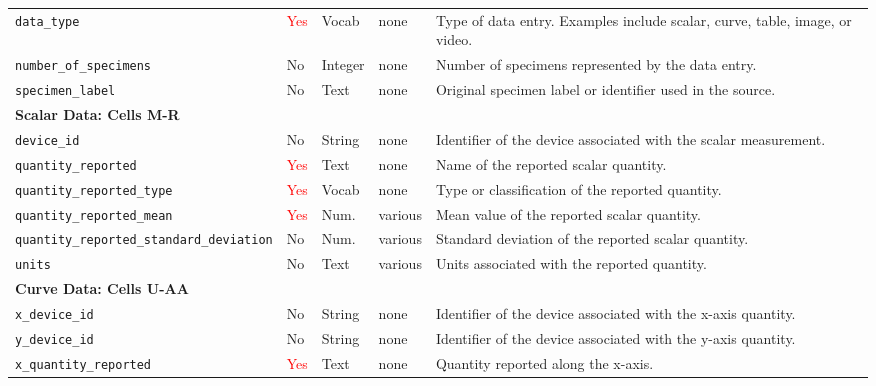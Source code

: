 \documentclass[11pt]{book}
\begin{document}
\begin{longtable}{p{}p{}p{}p{}p{}}
\texttt{data\_type} &
\textcolor{red}{Yes} &
Vocab &
none &
Type of data entry. Examples include scalar, curve, table, image, or video. \\

\texttt{number\_of\_specimens} &
No &
Integer &
none &
Number of specimens represented by the data entry. \\

\texttt{specimen\_label} &
No &
Text &
none &
Original specimen label or identifier used in the source. \\

\hline
\multicolumn{5}{l}{\textbf{Scalar Data: Cells M-R}} \\
\hline

\texttt{device\_id} &
No &
String &
none &
Identifier of the device associated with the scalar measurement. \\

\texttt{quantity\_reported} &
\textcolor{red}{Yes} &
Text &
none &
Name of the reported scalar quantity. \\

\texttt{quantity\_reported\_type} &
\textcolor{red}{Yes} &
Vocab &
none &
Type or classification of the reported quantity. \\

\texttt{quantity\_reported\_mean} &
\textcolor{red}{Yes} &
Num. &
various &
Mean value of the reported scalar quantity. \\

\texttt{quantity\_reported\_standard\_deviation} &
No &
Num. &
various &
Standard deviation of the reported scalar quantity. \\

\texttt{units} &
No &
Text &
various &
Units associated with the reported quantity. \\

\hline
\multicolumn{5}{l}{\textbf{Curve Data: Cells U-AA}} \\
\hline

\texttt{x\_device\_id} &
No &
String &
none &
Identifier of the device associated with the x-axis quantity. \\

\texttt{y\_device\_id} &
No &
String &
none &
Identifier of the device associated with the y-axis quantity. \\

\texttt{x\_quantity\_reported} &
\textcolor{red}{Yes} &
Text &
none &
Quantity reported along the x-axis. \\


\end{longtable}
\end{document}

